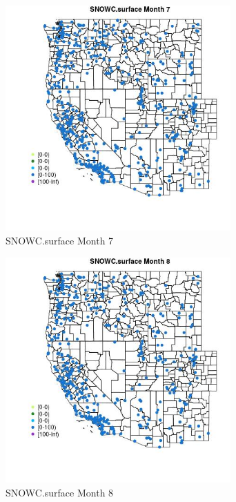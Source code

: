\begin{figure} 
\centering  
\includegraphics[width=0.77\textwidth]{Code_Outputs/Report_ML_input_PM25_Step4_part_e_de_duplicated_aves_compiled_2019-05-14wNAs_MapObsMo7SNOWCsurface.jpg} 
\caption{\label{fig:Report_ML_input_PM25_Step4_part_e_de_duplicated_aves_compiled_2019-05-14wNAsMapObsMo7SNOWCsurface}SNOWC.surface Month 7} 
\end{figure} 
 

\begin{figure} 
\centering  
\includegraphics[width=0.77\textwidth]{Code_Outputs/Report_ML_input_PM25_Step4_part_e_de_duplicated_aves_compiled_2019-05-14wNAs_MapObsMo8SNOWCsurface.jpg} 
\caption{\label{fig:Report_ML_input_PM25_Step4_part_e_de_duplicated_aves_compiled_2019-05-14wNAsMapObsMo8SNOWCsurface}SNOWC.surface Month 8} 
\end{figure} 
 

